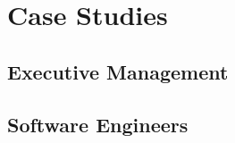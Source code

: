 \documentclass[a4paper,11pt]{article}
\begin{document}
\section{Case Studies}

\subsection{Executive Management}


\subsection{Software Engineers}

\end{document}
